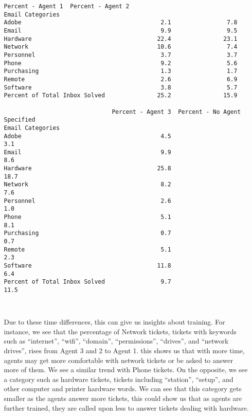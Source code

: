 \documentclass[11pt]{article}
\makeatletter
\newcommand{\boxspacing}{\kern\kvtcb@left@rule\kern\kvtcb@boxsep}
\newcommand{\prompt}[4]{
        \ttfamily\llap{{\color{#2}[#3]:\hspace{3pt}#4}}\vspace{-\baselineskip}
    }
\makeatother
\begin{document}
     \begin{tcolorbox}[breakable, size=fbox, boxrule=.5pt, pad at break*=1mm, opacityfill=0]
\prompt{Out}{outcolor}{85}{\boxspacing}
\begin{Verbatim}[commandchars=\\\{\}]
                               Percent - Agent 1  Percent - Agent 2 
Email Categories
Adobe                                        2.1                7.8
Email                                        9.9                9.5
Hardware                                    22.4               23.1
Network                                     10.6                7.4
Personnel                                    3.7                3.7
Phone                                        9.2                5.6
Purchasing                                   1.3                1.7
Remote                                       2.6                6.9
Software                                     3.8                5.7
Percent of Total Inbox Solved               25.2               15.9

                               Percent - Agent 3  Percent - No Agent Specified
Email Categories
Adobe                                        4.5                           3.1
Email                                        9.9                           8.6
Hardware                                    25.8                          18.7
Network                                      8.2                           7.6
Personnel                                    2.6                           1.0
Phone                                        5.1                           8.1
Purchasing                                   0.7                           0.7
Remote                                       5.1                           2.3
Software                                    11.8                           6.4
Percent of Total Inbox Solved                9.7                          11.5
\end{Verbatim}
\end{tcolorbox}
    \begin{center}
    \end{center}
    { \hspace*{\fill} \\}
    
    Due to these time differences, this can give us insights about training.
For instance, we see that the percentage of Network tickets, tickets
with keywords such as ``internet'', ``wifi'', ``domain'',
``permissions'', ``drives'', and ``network drives'', rises from Agent 3
and 2 to Agent 1. this shows us that with more time, agents may get more
comfortable with network tickets or be asked to answer more of them. We
see a similar trend with Phone tickets. On the opposite, we see a
category such as hardware tickets, tickets including ``station'',
``setup'', and other computer and printer hardware words. We can see
that this category gets smaller as the agents answer more tickets, this
could show us that as agents are further trained, they are called upon
less to answer tickets dealing with hardware.
\end{document}
